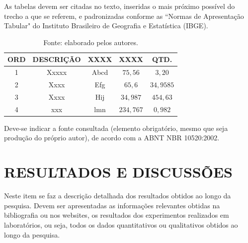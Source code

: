 \documentclass[12pt]{article}
\begin{document}
As tabelas devem ser citadas no texto, inseridas o mais próximo possível do trecho a que se referem, e padronizadas conforme as ``Normas de Apresentação Tabular" do Instituto Brasileiro de Geografia e Estatística (IBGE).


\begin{table}[H]
	\centering
	\caption{Título da tabela}
		\begin{tabular}{ccccc}
	\toprule
   \textbf{ORD}	& \textbf{DESCRIÇÃO} & \textbf{XXXX} & \textbf{XXXX} & \textbf{QTD.} \\
	\midrule
	1 & Xxxxx & Abcd & $75,56$ & $3,20$ \\
	2 & Xxxx & Efg & $65,6$ & $34,9585$ \\
	3 & Xxxx & Hij & $34,987$ &  $454,63$ \\
	4 & xxx & lmn & $234,767$ &  $0,982$ \\
	\bottomrule
\end{tabular}
\caption*{Fonte: elaborado pelos autores.}
\end{table}






Deve-se indicar a fonte consultada (elemento obrigatório, mesmo que seja produção do próprio autor), de acordo com a ABNT NBR 10520:2002.





\section{\large RESULTADOS E DISCUSSÕES}


Neste item se faz a descrição detalhada dos resultados obtidos ao longo da pesquisa.  Devem ser apresentadas as informações relevantes obtidas na bibliografia ou nos websites, os resultados dos experimentos realizados em laboratórios, ou seja, todos os dados quantitativos ou qualitativos obtidos ao longo da pesquisa. 
\end{document}
